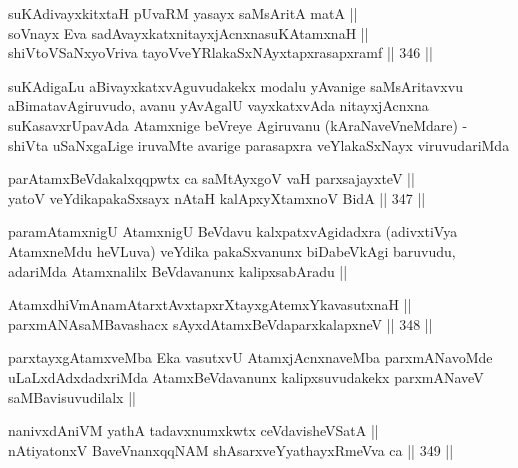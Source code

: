 
\begin{shl}
suKAdivayxkitxtaH pUvaRM yasayx saMsAritA matA || \\
soV\s nayx Eva sadAvayxkatxnitayxjAcnxnasuKAtamxnaH || \\
shiVtoVSaNxyoVriva tayoVveYRlakaSxNAyxtapxrasapxramf ||  346 ||  
\end{shl}

\begin{artha}
suKAdigaLu aBivayxkatxvAguvudakekx modalu yAvanige saMsAritavxvu
aBimatavAgiruvudo, avanu yAvAgalU vayxkatxvAda nitayxjAcnxna
suKasavxrUpavAda Atamxnige beVreye Agiruvanu (kAraNaveVneMdare) -
shiVta uSaNxgaLige iruvaMte avarige parasapxra veYlakaSxNayx
viruvudariMda 
\end{artha}

\begin{shl}
parAtamxBeVdakalxqqpwtx ca saMtAyxgoV vaH parxsajayxteV || \\
yatoV veYdikapakaSxsayx nAtaH kalApxyX\s \s tamxnoV BidA ||  347 ||  
\end{shl}

\begin{artha}
paramAtamxnigU AtamxnigU BeVdavu kalxpatxvAgidadxra (adivxtiVya
AtamxneMdu heVLuva) veYdika pakaSxvanunx biDabeVkAgi baruvudu,
adariMda Atamxnalilx BeVdavanunx kalipxsabAradu ||
\end{artha}


\begin{shl}
AtamxdhiVmAnamAtarxtAvxtapxrXtayxgAtemxYkavasutxnaH || \\
parxmANAsaMBavashacx sAyxdAtamxBeVdaparxkalapxneV ||  348 ||  
\end{shl}

\begin{artha}
parxtayxgAtamxveMba Eka vasutxvU AtamxjAcnxnaveMba parxmANavoMde
uLaLxdAdxdadxriMda AtamxBeVdavanunx kalipxsuvudakekx parxmANaveV
saMBavisuvudilalx ||
\end{artha}

\begin{shl}
nanivxdAniVM yathA tadavxnumxkwtx ceVdavisheVSatA || \\
nAtiyatonxV BaveVnanxqqNAM shAsarxveYyathayxRmeVva ca ||  349 ||  
\end{shl}


